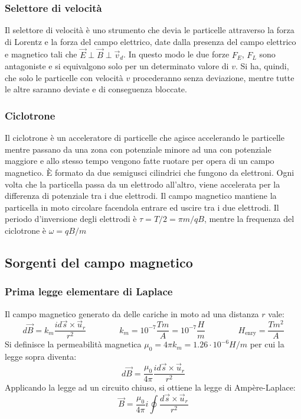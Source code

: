 \documentclass[a4paper]{article}
\newcommand\ur{\vec{u}_r}
\begin{document}
\subsubsection*{Selettore di velocità}
Il selettore di velocità è uno strumento che devia le particelle attraverso la forza di Lorentz e la forza del campo elettrico,
date dalla presenza del campo elettrico e magnetico tali che \(\vec{E} \perp \vec{B} \perp \vec{v}_d\). In questo modo le due
forze \(F_E\), \(F_L\) sono antagoniste e si equivalgono solo per un determinato valore di \(v\). Si ha, quindi, che solo le 
particelle con velocità \(v\) procederanno senza deviazione, mentre tutte le altre saranno deviate e di conseguenza bloccate.

\subsubsection*{Ciclotrone}
Il ciclotrone è un acceleratore di particelle che agisce accelerando le particelle mentre passano da una zona con potenziale
minore ad una con potenziale maggiore e allo stesso tempo vengono fatte ruotare per opera di un campo magnetico. È formato da
due semigusci cilindrici che fungono da elettroni. Ogni volta che la particella passa da un elettrodo all'altro, viene accelerata
per la differenza di potenziale tra i due elettrodi. Il campo magnetico mantiene la particella in moto circolare facendola entrare
ed uscire tra i due elettrodi. Il periodo d'inversione degli elettrodi è \(\tau = T/2 = \pi m/qB\), mentre la frequenza del
ciclotrone è \(\omega = qB/m\)

\subsection{Sorgenti del campo magnetico}
\subsubsection*{Prima legge elementare di Laplace}
Il campo magnetico generato da delle cariche in moto ad una distanza \(r\) vale:
\[d\vec{B} = k_m \frac{i d\vec{s} \times \ur}{r^2} \qquad \qquad k_m = 10^{-7} \frac{T m}{A} = 10^{-7} \frac{H}{m} \qquad \qquad H_\text{enry} = \frac{T m^2}{A}\]
Si definisce la permeabilità magnetica \(\mu_0 = 4 \pi k_m = 1.26 \cdot 10^{-6} H/m\) per cui la legge sopra diventa:
\[d\vec{B} = \frac{\mu_0}{4 \pi} \frac{i d\vec{s} \times \ur}{r^2}\]
Applicando la legge ad un circuito chiuso, si ottiene la legge di Ampère-Laplace:
\[\vec{B} = \frac{\mu_0}{4 \pi} i \oint \frac{d\vec{s} \times \ur}{r^2} \]
\end{document}

